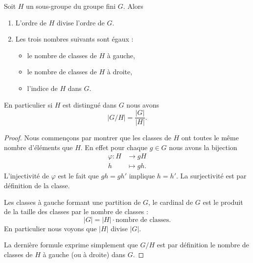 \begin{theorem}    \label{ThoLagrange}
    Soit \( H\) un sous-groupe du groupe fini \( G\).  Alors
    \begin{enumerate}
        \item   \label{ITEMooDPKSooNpOusd}
    L'ordre de \( H\) divise l'ordre de \( G\).
\item
    Les trois nombres suivants sont égaux :
    \begin{itemize}
        \item
            le nombre de classes de \( H\) à gauche,
        \item
            le nombre de classes de \( H\) à droite,
        \item
            l'indice de \( H\) dans \( G\).
    \end{itemize}
    \end{enumerate}
    En particulier si \( H\) est distingué dans \( G\) nous avons
    \begin{equation}
        | G/H |=\frac{ | G | }{ | H | }.
    \end{equation}
\end{theorem}

\begin{proof}
    Nous commençons par montrer que les classes de \( H\) ont toutes le même nombre d'éléments que \( H\). En effet pour chaque \( g\in G\) nous avons la bijection
    \begin{equation}
        \begin{aligned}
            \varphi\colon H&\to gH \\
            h&\mapsto gh.
        \end{aligned}
    \end{equation}
    L'injectivité de \( \varphi\) est le fait que \( gh=gh'\) implique \( h=h'\). La surjectivité est par définition de la classe.

    Les classes à gauche formant une partition de \( G\), le cardinal de \( G\) est le produit de la taille des classes par le nombre de classes :
    \begin{equation}
        | G |=| H |\cdot\text{nombre de classes}.
    \end{equation}
    En particulier nous voyons que \( | H |\) divise \( | G |\).

    La dernière formule exprime simplement que \( G/H\) est par définition le nombre de classes de \( H\) à gauche (ou à droite) dans \( G\).
\end{proof}

